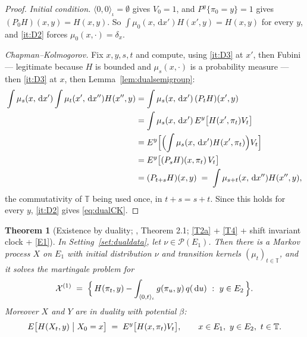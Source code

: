 \documentclass[11pt,a4paper]{article}
\theoremstyle{plain}
\newtheorem{theorem}{Theorem}[section]
\theoremstyle{definition}
\theoremstyle{remark}
\newcommand{\T}{\mathbb{T}}                     %
\newcommand{\Prob}{\mathcal{P}}                %
\newcommand{\DGP}{\cite{DGP24}}
\newcommand{\XX}{\mathcal{X}}                  %
\newcommand{\dif}{\,\mathrm{d}}
\begin{document}
\begin{proof}
  \emph{Initial condition.}  $\langle 0,0\rangle_\iota = \emptyset$ gives
  $V_0 = 1$, and $P^y\{\pi_0 = y\} = 1$ gives
  $(P_0H)(x,y) = H(x,y)$.  So $\int \mu_0(x,\dif x')H(x',y) = H(x,y)$ for every
  $y$, and \ref{it:D2} forces $\mu_0(x,\cdot) = \delta_x$.

  \emph{Chapman--Kolmogorov.}  Fix $x,y,s,t$ and compute, using \ref{it:D3} at
  $x'$, then Fubini --- legitimate because $H$ is bounded and $\mu_s(x,\cdot)$ is
  a probability measure --- then \ref{it:D3} at $x$, then
  Lemma~\ref{lem:dualsemigroup}:
  \begin{align*}
    \int \mu_s(x,\dif x') \int \mu_t(x',\dif x'') H(x'',y)
      &= \int \mu_s(x,\dif x') \, (P_tH)(x',y) \\
      &= \int \mu_s(x,\dif x') \, E^y\bigl[ H(x',\pi_t) V_t \bigr] \\
      &= E^y\Bigl[ \Bigl( \int \mu_s(x,\dif x') H(x',\pi_t) \Bigr) V_t \Bigr] \\
      &= E^y\bigl[ (P_sH)(x,\pi_t) \, V_t \bigr] \\
      &= (P_{t+s}H)(x,y)
       \;=\; \int \mu_{s+t}(x,\dif x'') H(x'',y) ,
  \end{align*}
  the commutativity of $\T$ being used once, in $t+s = s+t$.  Since this holds
  for every $y$, \ref{it:D2} gives \eqref{eq:dualCK}.
\end{proof}

\begin{theorem}[Existence by duality; \DGP, Theorem 2.1; \eqref{T2a} + \eqref{T4} + shift invariant clock + \eqref{E1}]
  \label{thm:exduality}
  In Setting~\ref{set:dualdata}, let $\nu \in \Prob(E_1)$.  Then there is a Markov
  process $X$ on $E_1$ with initial distribution $\nu$ and transition kernels
  $(\mu_t)_{t \in \T}$, and it solves the martingale problem for
  \begin{equation}
    \label{eq:dualMP}
    \XX^{(1)} \;=\; \Bigl\{ \, H(\pi_t,y)
      - \int_{\langle 0,t\rangle_\iota} g(\pi_u,y) \, q(\dif u)
      \ : \ y \in E_2 \, \Bigr\} .
  \end{equation}
  Moreover $X$ and $Y$ are in duality with potential $\beta$:
  \begin{equation}
    \label{eq:dualityrel}
    E\bigl[ H(X_t,y) \bigm| X_0 = x \bigr]
      \;=\; E^y\bigl[ H(x,\pi_t) V_t \bigr] ,
    \qquad x \in E_1, \ y \in E_2, \ t \in \T .
  \end{equation}
\end{theorem}
\end{document}
